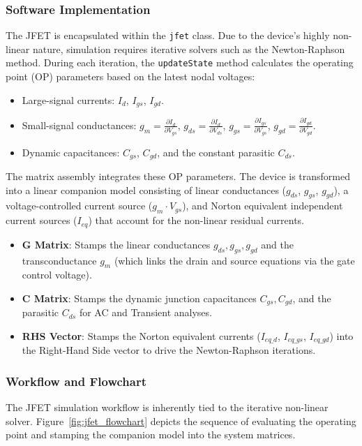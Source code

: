 \subsubsection{Software Implementation}
The JFET is encapsulated within the \texttt{jfet} class. Due to the device's highly non-linear nature, simulation requires iterative solvers such as the Newton-Raphson method. During each iteration, the \texttt{updateState} method calculates the operating point (OP) parameters based on the latest nodal voltages:
\begin{itemize}
    \item Large-signal currents: $I_d$, $I_{gs}$, $I_{gd}$.
    \item Small-signal conductances: $g_m = \frac{\partial I_d}{\partial V_{gs}}$, $g_{ds} = \frac{\partial I_d}{\partial V_{ds}}$, $g_{gs} = \frac{\partial I_{gs}}{\partial V_{gs}}$, $g_{gd} = \frac{\partial I_{gd}}{\partial V_{gd}}$.
    \item Dynamic capacitances: $C_{gs}$, $C_{gd}$, and the constant parasitic $C_{ds}$.
\end{itemize}

The matrix assembly integrates these OP parameters. The device is transformed into a linear companion model consisting of linear conductances ($g_{ds}$, $g_{gs}$, $g_{gd}$), a voltage-controlled current source ($g_m \cdot V_{gs}$), and Norton equivalent independent current sources ($I_{eq}$) that account for the non-linear residual currents. 
\begin{itemize}
    \item \textbf{G Matrix}: Stamps the linear conductances $g_{ds}, g_{gs}, g_{gd}$ and the transconductance $g_m$ (which links the drain and source equations via the gate control voltage).
    \item \textbf{C Matrix}: Stamps the dynamic junction capacitances $C_{gs}, C_{gd}$, and the parasitic $C_{ds}$ for AC and Transient analyses.
    \item \textbf{RHS Vector}: Stamps the Norton equivalent currents ($I_{eq\_d}$, $I_{eq\_gs}$, $I_{eq\_gd}$) into the Right-Hand Side vector to drive the Newton-Raphson iterations.
\end{itemize}

\subsubsection{Workflow and Flowchart}
The JFET simulation workflow is inherently tied to the iterative non-linear solver. Figure~\ref{fig:jfet_flowchart} depicts the sequence of evaluating the operating point and stamping the companion model into the system matrices.

